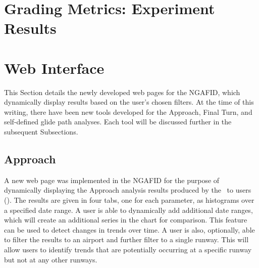 \section{Grading Metrics:  Experiment Results}

    
    
\section{Web Interface}

	This Section details the newly developed web pages for the NGAFID, which dynamically display results based on the user's chosen filters.  At the time of this writing, there have been new tools developed for the Approach, Final Turn, and self-defined glide path analyses.  Each tool will be discussed further in the subsequent Subsections.
    
    
    \subsection{Approach}
    
    	A new web page was implemented in the NGAFID for the purpose of dynamically displaying the Approach analysis results produced by the \toolname\ to users ().  The results are given in four tabs, one for each parameter, as histograms over a specified date range.  A user is able to dynamically add additional date ranges, which will create an additional series in the chart for comparison.  This feature can be used to detect changes in trends over time.  A user is also, optionally, able to filter the results to an airport and further filter to a single runway.  This will allow users to identify trends that are potentially occurring at a specific runway but not at any other runways.
    
